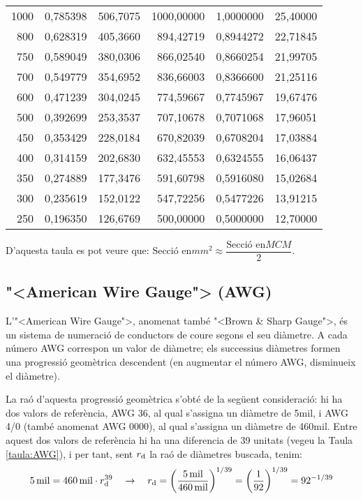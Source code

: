 \begin{longtable}{r<{\hspace{0.6em}}rrrrr}
1000 &   0,785398 &   506,7075 & 1000,00000 &  1,0000000 &   25,40000 \\
 800 &   0,628319 &   405,3660 &  894,42719 &  0,8944272 &   22,71845 \\
 750 &   0,589049 &   380,0306 &  866,02540 &  0,8660254 &   21,99705 \\
 700 &   0,549779 &   354,6952 &  836,66003 &  0,8366600 &   21,25116 \\
 600 &   0,471239 &   304,0245 &  774,59667 &  0,7745967 &   19,67476 \\
 500 &   0,392699 &   253,3537 &  707,10678 &  0,7071068 &   17,96051 \\
 450 &   0,353429 &   228,0184 &  670,82039 &  0,6708204 &   17,03884 \\
 400 &   0,314159 &   202,6830 &  632,45553 &  0,6324555 &   16,06437 \\
 350 &   0,274889 &   177,3476 &  591,60798 &  0,5916080 &   15,02684 \\
 300 &   0,235619 &   152,0122 &  547,72256 &  0,5477226 &   13,91215 \\
 250 &   0,196350 &   126,6769 &  500,00000 &  0,5000000 &   12,70000 \\
\bottomrule[1pt]
\end{longtable}

D'aquesta taula es pot veure que: $\text{Secci\'{o} en}\unit{mm^2} \approx \dfrac{\text{Secci\'{o} en}\unit{MCM}}{2}$.

\break
\subsection{{"<}American Wire Gauge{">} (AWG)}

L'{"<}American Wire Gauge{">}, anomenat tamb\'{e} {"<}Brown \& Sharp Gauge{">}, \'{e}s un sistema de numeraci\'{o} de conductors de coure segons el seu di\`{a}metre. A cada n\'{u}mero AWG correspon un valor de di\`{a}metre; els successius di\`{a}metres formen una progressi\'{o} geom\`{e}trica descendent (en augmentar el n\'{u}mero AWG, disminueix el di\`{a}metre).

La ra\'{o} d'aquesta progressi\'{o} geom\`{e}trica s'obt\'{e} de la seg\"{u}ent consideraci\'{o}: hi ha dos valors de refer\`{e}ncia, AWG 36, al qual s'assigna un di\`{a}metre de 5\unit{mil}, i AWG 4/0 (tamb\'{e} anomenat AWG 0000), al qual s'assigna un di\`{a}metre de 460\unit{mil}. Entre aquest dos valors de refer\`{e}ncia hi ha una diferencia de 39 unitats (vegeu la Taula \vref{taula:AWG}), i per tant, sent $r_\mathrm{d}$ la ra\'{o} de di\`{a}metres buscada, tenim:
\begin{equation}
   5\mathrm{\,mil} = 460\mathrm{\,mil} \cdot r_\mathrm{d}^{39} \quad \rightarrow \quad r_\mathrm{d} = \left( \frac{5\mathrm{\,mil}}{460\mathrm{\,mil}} \right)^{1/39} = \left( \frac{1}{92} \right)^{1/39} = 92^{-1/39}
\end{equation}

